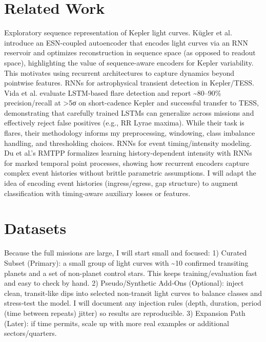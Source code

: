 \documentclass[letterpaper]{article}
\begin{document}
\section{Related Work}
Exploratory sequence representation of Kepler light curves. Kügler et al. introduce an ESN-coupled autoencoder that encodes light curves via an RNN reservoir and optimizes reconstruction in sequence space (as opposed to readout space), highlighting the value of sequence-aware encoders for Kepler variability. This motivates using recurrent architectures to capture dynamics beyond pointwise features.
RNNs for astrophysical transient detection in Kepler/TESS. Vida et al. evaluate LSTM-based flare detection and report \textasciitilde{}80–90\% precision/recall at >5σ on short-cadence Kepler and successful transfer to TESS, demonstrating that carefully trained LSTMs can generalize across missions and effectively reject false positives (e.g., RR Lyrae maxima). While their task is flares, their methodology informs my preprocessing, windowing, class imbalance handling, and thresholding choices.
RNNs for event timing/intensity modeling. Du et al.’s RMTPP formalizes learning history-dependent intensity with RNNs for marked temporal point processes, showing how recurrent encoders capture complex event histories without brittle parametric assumptions. I will adapt the idea of encoding event histories (ingress/egress, gap structure) to augment classification with timing-aware auxiliary losses or features.

\section{Datasets}
Because the full missions are large, I will start small and focused:
1) Curated Subset (Primary): a small group of light curves with \textasciitilde{}10 confirmed transiting planets and a set of non-planet control stars. This keeps training/evaluation fast and easy to check by hand.
2) Pseudo/Synthetic Add‑Ons (Optional): inject clean, transit‑like dips into selected non-transit light curves to balance classes and stress‑test the model. I will document any injection rules (depth, duration, period (time between repeats) jitter) so results are reproducible.
3) Expansion Path (Later): if time permits, scale up with more real examples or additional sectors/quarters.
\end{document}
